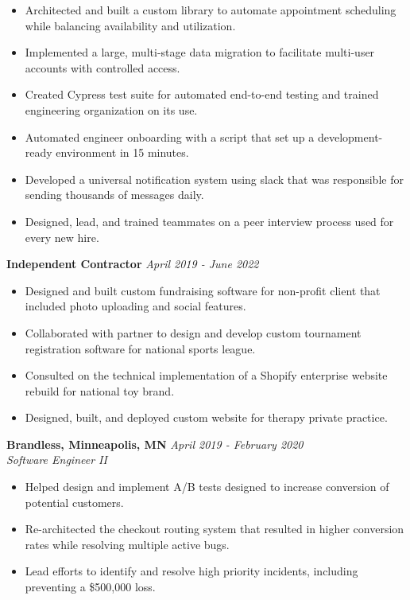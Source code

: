 \documentclass{res}
\begin{document}
\begin{resume}
			\begin{itemize} \itemsep -2pt
        \item Architected and built a custom library to automate appointment scheduling while balancing availability and utilization.
        \item Implemented a large, multi-stage data migration to facilitate multi-user accounts with controlled access.
				\item Created Cypress test suite for automated end-to-end testing and trained engineering organization on its use.
        \item Automated engineer onboarding with a script that set up a development-ready environment in 15 minutes.
				\item Developed a universal notification system using slack that was responsible for sending thousands of messages daily.
				\item Designed, lead, and trained teammates on a peer interview process used for every new hire.
			\end{itemize}

		{\bf Independent Contractor} \hfill \emph{April 2019 - June 2022}
			\begin{itemize} \itemsep -2pt
				\item Designed and built custom fundraising software for non-profit client that included photo uploading and social features.
				\item Collaborated with partner to design and develop custom tournament registration software for national sports league.
				\item Consulted on the technical implementation of a Shopify enterprise website rebuild for national toy brand.
				\item Designed, built, and deployed custom website for therapy private practice.
			\end{itemize}

		{\bf Brandless, Minneapolis, MN} \hfill \emph{April 2019 - February 2020} \\
			\emph{Software Engineer II}

			\begin{itemize} \itemsep -2pt
				\item Helped design and implement A/B tests designed to increase conversion of potential customers.
        \item Re-architected the checkout routing system that resulted in higher conversion rates while resolving multiple active bugs.
        \item Lead efforts to identify and resolve high priority incidents, including preventing a \$500,000 loss.
			\end{itemize}


\end{resume}
\end{document}

